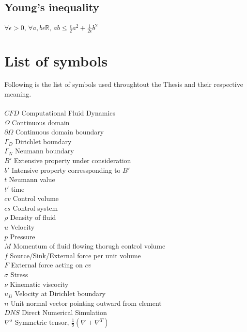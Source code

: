 \documentclass[a4paper,12pt]{book}
\begin{document}
\subsection{Young's inequality} 
\begin{center}
$\forall \epsilon > 0$, $\forall a,b \epsilon \mathbb{R}$, $ab \leq \frac{\epsilon}{2}a^2 + \frac{1}{2 \epsilon}b^2$\\
\end{center}

\section{List of symbols} \label{symbol_list}

Following is the list of symbols used throughtout the Thesis and their respective meaning.\\
${}$\\
$CFD$ Computational Fluid Dynamics\\
$\Omega$ Continuous domain\\
$\partial \Omega$ Continuous domain boundary\\
$\Gamma_D$ Dirichlet boundary\\
$\Gamma_N$ Neumann boundary\\
$B'$ Extensive property under consideration \\
$b'$ Intensive property corressponding to $B'$\\
$t$ Neumann value\\
$t'$ time\\
$cv$ Control volume\\
$cs$ Control system\\
$\rho$ Density of fluid \\
$u$ Velocity\\
$p$ Pressure\\
$M$ Momentum of fluid flowing thorugh control volume\\
$f$ Source/Sink/External force per unit volume\\
$F$ External force acting on $cv$\\
$\sigma$ Stress\\
$\nu$ Kinematic viscocity\\
$u_D$ Velocity at Dirichlet boundary\\
$n$ Unit normal vector pointing outward from element\\
$DNS$ Direct Numerical Simulation\\
$\nabla^s$ Symmetric tensor, $\frac{1}{2} (\nabla + \nabla^T)$\\
\end{document}
